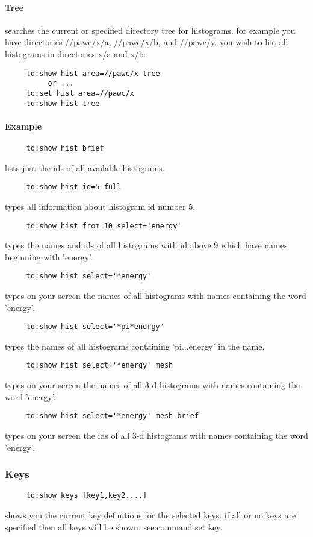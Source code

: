 \paragraph{Tree}
searches the current or specified directory tree for histograms.  for
example you have directories //pawc/x/a,  //pawc/x/b,  and  //pawc/y.
you wish to list all histograms in directories x/a and x/b:  
\begin{verbatim}
     td:show hist area=//pawc/x tree 
          or ...  
     td:set hist area=//pawc/x 
     td:show hist tree 
\end{verbatim}
\paragraph{Example}
\begin{verbatim}
     td:show hist brief 
\end{verbatim}
lists just the ids of all available histograms.  
\begin{verbatim}
     td:show hist id=5 full 
\end{verbatim}
types all information about histogram id number 5.  
\begin{verbatim}
     td:show hist from 10 select='energy' 
\end{verbatim}
types  the names and ids of all histograms with id above 9 which have
names beginning with 'energy'.  
\begin{verbatim}
     td:show hist select='*energy' 
\end{verbatim}
types  on  your  screen  the  names  of  all  histograms  with  names
containing the word 'energy'.  
\begin{verbatim}
     td:show hist select='*pi*energy' 
\end{verbatim}
types  the  names  of  all histograms containing 'pi...energy' in the
name.  
\begin{verbatim}
     td:show hist select='*energy' mesh 
\end{verbatim}
types  on  your  screen  the  names  of all 3-d histograms with names
containing the word 'energy'.  
\begin{verbatim}
     td:show hist select='*energy' mesh brief 
\end{verbatim}
types  on  your  screen  the  ids  of  all  3-d histograms with names
containing the word 'energy'.  
\subsubsection{Keys}
\begin{verbatim}
     td:show keys [key1,key2....] 
\end{verbatim}
shows you the current key definitions for the selected keys.  if all or
no   keys   are   specified   then   all   keys    will    be    shown.
see:command set key.  

